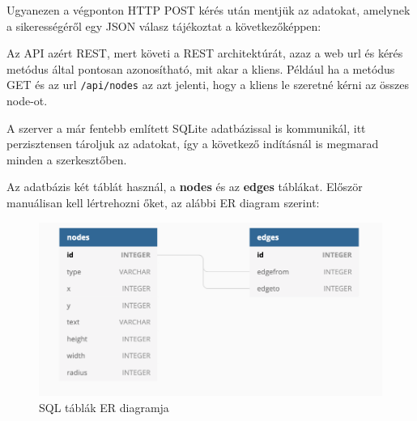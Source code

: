 
Ugyanezen a végponton HTTP POST kérés után mentjük az adatokat, amelynek a sikerességéről egy JSON válasz tájékoztat a következőképpen:

\begin{json}
\end{json}


Az API azért REST, mert követi a REST architektúrát, azaz a web url és kérés metódus által pontosan azonosítható, mit akar a kliens. Például ha a metódus GET és az url \texttt{/api/nodes} az azt jelenti, hogy a kliens le szeretné kérni az összes node-ot.
 
A szerver a már fentebb említett SQLite adatbázissal is kommunikál, itt perzisztensen tároljuk az adatokat, így a következő indításnál is megmarad minden a szerkesztőben.

Az adatbázis két táblát használ, a \textbf{nodes} és az \textbf{edges} táblákat. Először manuálisan kell lértrehozni őket, az alábbi ER diagram szerint:

\begin{figure}[h]
\centering
\includegraphics[scale=0.65]{images/sqltables.png}
\caption{SQL táblák ER diagramja}
\label{fig:sql}
\end{figure}

